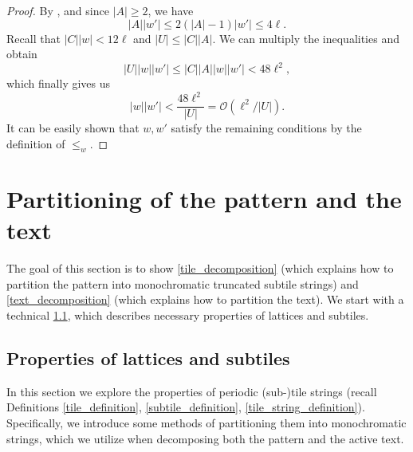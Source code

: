 \documentclass[11pt, letterpaper]{article}
\theoremstyle{plain}
\theoremstyle{definition}
\theoremstyle{remark}
\renewcommand{\O}{\mathcal{O}}
\begin{document}
\begin{proof}
By , and since $|A| \ge 2$, we have
\[|A||w'| \le 2(|A| - 1) |w'| \le 4\ell.\]
Recall that $|C||w| < 12\ell$ and $|U| \le |C| |A|$. We can multiply the inequalities and obtain
\[ |U||w||w'| \le |C||A||w||w'| < 48 \ell^2,\]
which finally gives us
\[|w||w'| < \frac{48\ell^2}{|U|} = \O(\ell^2 / |U|). \]
It can be easily shown that $w, w'$ satisfy the remaining conditions by the definition of $\le_w$.
\end{proof}

\section{Partitioning of the pattern and the text}
The goal of this section is to show \cref{tile_decomposition} (which explains how to partition the pattern into monochromatic truncated subtile strings) and \cref{text_decomposition} (which explains how to partition the text). We start with a technical \cref{sec:lattices_subtiles}, which describes necessary properties of lattices and subtiles. 
 
\subsection{Properties of lattices and subtiles} \label{sec:lattices_subtiles}
In this section we explore the properties of periodic (sub-)tile strings (recall Definitions \ref{tile_definition}, \ref{subtile_definition}, \ref{tile_string_definition}).
Specifically, we introduce some methods of partitioning them into monochromatic strings, which we utilize when decomposing both the pattern and the active text.
\end{document}
